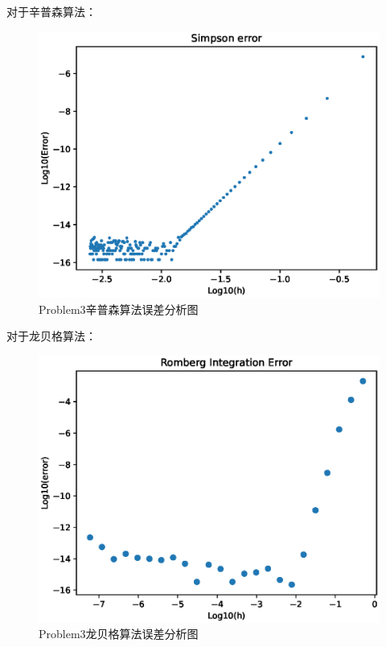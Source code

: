 \documentclass[12pt,a4paper]{article}%
\begin{document}
    对于辛普森算法：

    \begin{figure}[H]%
        \centering
        \begin{minipage}{0.83\textwidth}%
            \centering
            \includegraphics[width=1.0%
            \textwidth]{Problem3.2}%
            \caption{\fontsize{10pt}{15pt}\selectfont Problem3辛普森算法误差分析图}%
        \end{minipage}\label{fig:figure4}
    \end{figure}

    对于龙贝格算法：
    \begin{figure}[H]%
        \centering
        \begin{minipage}{0.83\textwidth}%
            \centering
            \includegraphics[width=1.0%
            \textwidth]{Problem3.3}%
            \caption{\fontsize{10pt}{15pt}\selectfont Problem3龙贝格算法误差分析图}%
        \end{minipage}\label{fig:figure5}
    \end{figure}
\end{document}
